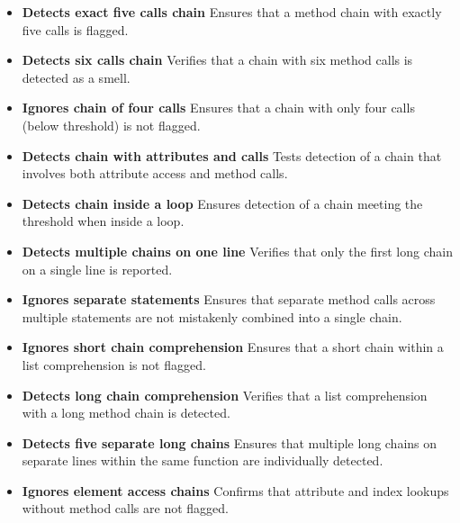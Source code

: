 \documentclass[12pt, titlepage]{article}
\begin{document}
\begin{itemize}
    \item \textbf{Detects exact five calls chain} \newline
    Ensures that a method chain with exactly five calls is flagged.
    
    \item \textbf{Detects six calls chain} \newline
    Verifies that a chain with six method calls is detected as a smell.
    
    \item \textbf{Ignores chain of four calls} \newline
    Ensures that a chain with only four calls (below threshold) is not flagged.
    
    \item \textbf{Detects chain with attributes and calls} \newline
    Tests detection of a chain that involves both attribute access and method calls.
    
    \item \textbf{Detects chain inside a loop} \newline
    Ensures detection of a chain meeting the threshold when inside a loop.
    
    \item \textbf{Detects multiple chains on one line} \newline
    Verifies that only the first long chain on a single line is reported.
    
    \item \textbf{Ignores separate statements} \newline
    Ensures that separate method calls across multiple statements are not mistakenly combined into a single chain.
    
    \item \textbf{Ignores short chain comprehension} \newline
    Ensures that a short chain within a list comprehension is not flagged.
    
    \item \textbf{Detects long chain comprehension} \newline
    Verifies that a list comprehension with a long method chain is detected.
    
    \item \textbf{Detects five separate long chains} \newline
    Ensures that multiple long chains on separate lines within the same function are individually detected.
    
    \item \textbf{Ignores element access chains} \newline
    Confirms that attribute and index lookups without method calls are not flagged.
\end{itemize}
\end{document}
